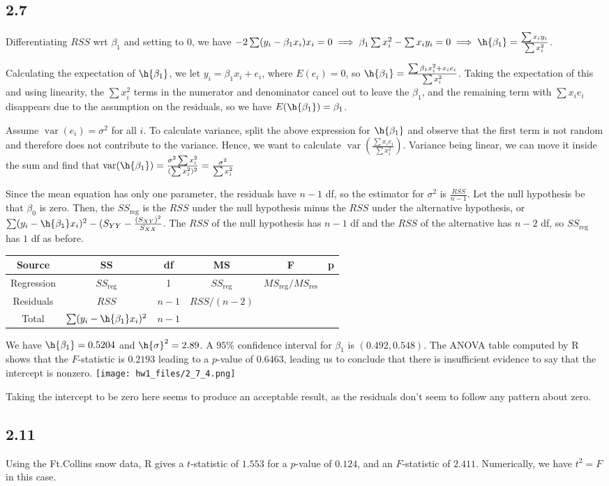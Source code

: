 \documentclass{article}
\DeclareMathOperator{\var}{var}
\begin{document}
\subsection*{2.7}
Differentiating $RSS$ wrt $\beta_1$ and setting to $0$, we have $-2\sum(y_i-\beta_1x_i)x_i=0\implies \beta_1\sum x_i^2-\sum x_iy_i=0\implies \h{\beta_1}=\frac{\sum x_iy_i}{\sum x_i^2}$.

Calculating the expectation of $\h{\beta_1}$, we let $y_i=\beta_1x_i+e_i$, where $E(e_i)=0$, so $\h{\beta_1}=\frac{\sum \beta_1x_i^2+x_ie_i}{\sum x_i^2}$. Taking the expectation of this and using linearity, the $\sum x_i^2$ terms in the numerator and denominator cancel out to leave the $\beta_1$, and the remaining term with $\sum x_ie_i$ disappears due to the assumption on the residuals, so we have $E(\h{\beta_1})=\beta_1$.

Assume $\var(e_i)=\sigma^2$ for all $i$. To calculate variance, split the above expression for $\h{\beta_1}$ and observe that the first term is not random and therefore does not contribute to the variance. Hence, we want to calculate $\var\left(\frac{\sum x_ie_i}{\sum x_i^2}\right)$. Variance being linear, we can move it inside the sum and find that $\var(\h{\beta_1})=\frac{\sigma^2\sum x_i^2}{(\sum x_i^2)^2}=\frac{\sigma^2}{\sum x_i^2}$

Since the mean equation has only one parameter, the residuals have $n-1$ df, so the estimator for $\sigma^2$ is $\frac{RSS}{n-1}$.
Let the null hypothesis be that $\beta_0$ is zero. Then, the $SS_\text{reg}$ is the $RSS$ under the null hypothesis minus the $RSS$ under the alternative hypothesis, or $\sum(y_i-\h{\beta_1}x_i)^2-(S_{YY}-\frac{(S_{XY})^2}{S_{XX}}$. The $RSS$ of the null hypothesis has $n-1$ df and the $RSS$ of the alternative has $n-2$ df, so $SS_\text{reg}$ has $1$ df as before. 

\begin{tabular}{cccccc}
\hline
Source & SS & df & MS & F & p\\
\hline
Regression & $SS_\text{reg}$ & 1 & $SS_\text{reg}$ & $MS_\text{reg}/MS_\text{res}$ & \\
Residuals & $RSS$ & $n-1$ & $RSS/(n-2)$ \\
Total & $\sum (y_i-\h{\beta_1}x_i)^2$ & $n-1$\\
\end{tabular}

We have $\h{\beta_1}=0.5204$ and $\h{\sigma}^2=2.89$. A $95\%$ confidence interval for $\beta_1$ is $(0.492,0.548)$. The ANOVA table computed by R shows that the $F$-statistic is $0.2193$ leading to a $p$-value of $0.6463$, leading us to conclude that there is insufficient evidence to say that the intercept is nonzero.
\texttt{[image: hw1\_files/2\_7\_4.png]}

Taking the intercept to be zero here seems to produce an acceptable result, as the residuals don't seem to follow any pattern about zero.
\subsection*{2.11}
Using the Ft.Collins snow data, R gives a $t$-statistic of $1.553$ for a $p$-value of $0.124$, and an $F$-statistic of $2.411$. Numerically, we have $t^2=F$ in this case.
\end{document}
